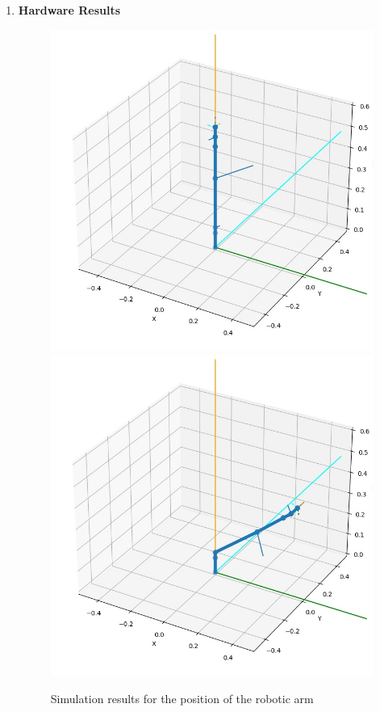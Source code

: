 \documentclass[12pt,a4paper]{report}
\begin{document}
\begin{enumerate}
\item {\bf{ Hardware Results }} 

\begin{figure}[H]
\begin{center}
\includegraphics[scale=0.3]{images/results/simulation_1.jpg}
\hspace{0.2in}
\includegraphics[scale=0.3]{images/results/simulation_2.jpg}
\caption{Simulation results for the position of the robotic arm}
\end{center}
\end{figure}



\end{enumerate}
\end{document}
